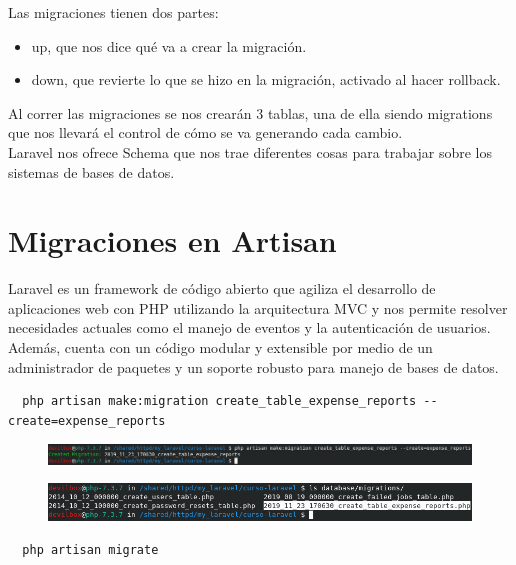 \documentclass{article}
\begin{document}
Las migraciones tienen dos partes:

\begin{itemize}
  \item up, que nos dice qué va a crear la migración.
  \item down, que revierte lo que se hizo en la migración, activado al hacer
    rollback.
\end{itemize}

Al correr las migraciones se nos crearán 3 tablas, una de ella siendo
migrations que nos llevará el control de cómo se va generando cada cambio.\\

Laravel nos ofrece Schema que nos trae diferentes cosas para trabajar sobre los
sistemas de bases de datos.

\newpage


\section{Migraciones en Artisan}%
Laravel es un framework de código abierto que agiliza el desarrollo de
aplicaciones web con PHP utilizando la arquitectura MVC y nos permite resolver
necesidades actuales como el manejo de eventos y la autenticación de usuarios.
Además, cuenta con un código modular y extensible por medio de un administrador
de paquetes y un soporte robusto para manejo de bases de datos.\\


\begin{verbatim}
  php artisan make:migration create_table_expense_reports --create=expense_reports
\end{verbatim}

\begin{figure}[h!]
  \centering
  \includegraphics[scale=0.55]{./Pictures/026_create_table_artisan.png}
\end{figure}

\begin{figure}[h!]
  \centering
  \includegraphics[scale=0.75]{./Pictures/027_migration_file.png}
\end{figure}


\begin{verbatim}
  php artisan migrate
\end{verbatim}
\end{document}
